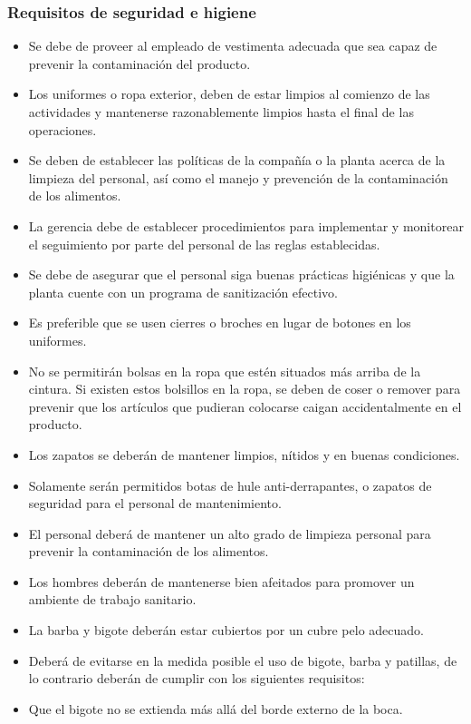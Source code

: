 \subsubsection{Requisitos de seguridad e higiene}

\begin{itemize}
	\item Se debe de proveer al empleado de vestimenta adecuada que sea capaz de prevenir la contaminación del producto.
	\item Los uniformes o ropa exterior, deben de estar limpios al comienzo de las actividades y mantenerse razonablemente limpios hasta el final de las operaciones.
	\item Se deben de establecer las políticas de la compañía o la planta acerca de la limpieza del personal, así como el manejo y prevención de la contaminación de los alimentos.
	\item La gerencia debe de establecer procedimientos para implementar y monitorear el seguimiento por parte del personal de las reglas establecidas.
	\item Se debe de asegurar que el personal siga buenas prácticas higiénicas y que la planta cuente con un programa de sanitización efectivo.
	\item Es preferible que se usen cierres o broches en lugar de botones en los uniformes.
	\item No se permitirán bolsas en la ropa que estén situados más arriba de la cintura. Si existen estos bolsillos en la ropa, se deben de coser o remover para prevenir que los artículos que pudieran colocarse caigan accidentalmente en el producto.
	\item Los zapatos se deberán de mantener limpios, nítidos y en buenas condiciones.
	\item Solamente serán permitidos botas de hule anti-derrapantes, o zapatos de seguridad para el personal de mantenimiento.
	\item El personal deberá de mantener un alto grado de limpieza personal para prevenir la contaminación de los alimentos.
	\item Los hombres deberán de mantenerse bien afeitados para promover un ambiente de trabajo sanitario.
	\item La barba y bigote deberán estar cubiertos por un cubre pelo adecuado.
	\item Deberá de evitarse en la medida posible el uso de bigote, barba y patillas, de lo contrario deberán de cumplir con los siguientes requisitos:
	\item Que el bigote no se extienda más allá del borde externo de la boca.

\end{itemize}

